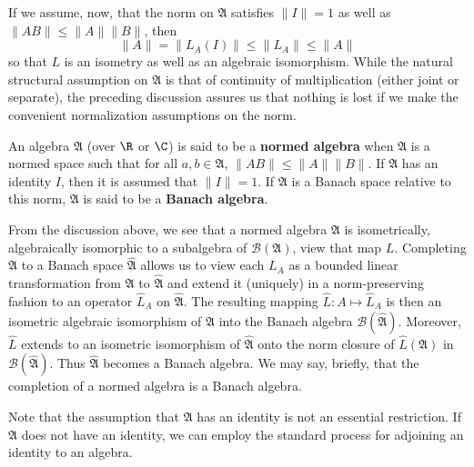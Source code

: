 If we assume, now, that the norm on $\mathfrak{A}$ satisfies $\|I\|=1$ as well as $\|AB\|\leq\|A\|\|B\|$, then
\[\|A\|=\|L_A(I)\|\leq\|L_A\|\leq\|A\|\]
so that $L$ is an isometry as well as an algebraic isomorphism. While the natural structural assumption on $\mathfrak{A}$ is that of continuity of multiplication (either joint or separate), the preceding discussion assures us that nothing is lost if we make the convenient normalization assumptions on the norm.
\begin{definition}
An algebra $\mathfrak{A}$ (over $\R$ or $\C$) is said to be a \textbf{normed algebra} when $\mathfrak{A}$ is a normed space such that for all $a,b\in\mathfrak{A}$, $\|AB\|\leq\|A\|\|B\|$. If $\mathfrak{A}$ has an identity $I$, then it is assumed that $\|I\|=1$. If $\mathfrak{A}$ is a Banach space relative to this norm, $\mathfrak{A}$ is said to be a \textbf{Banach algebra}.
\end{definition}
From the discussion above, we see that a normed algebra $\mathfrak{A}$ is isometrically, algebraically isomorphic to a subalgebra of $\mathcal{B}(\mathfrak{A})$, view that map $L$. Completing $\mathfrak{A}$ to a Banach space $\widehat{\mathfrak{A}}$ allows us to view each $L_A$ as a bounded linear transformation from $\mathfrak{A}$ to $\widehat{\mathfrak{A}}$ and extend it (uniquely) in a norm-preserving fashion to an operator $\hat{L}_A$ on $\widehat{\mathfrak{A}}$. The resulting mapping $\hat{L}:A\mapsto\hat{L}_A$ is then an isometric algebraic isomorphism of $\mathfrak{A}$ into the Banach algebra $\mathcal{B}(\widehat{\mathfrak{A}})$. Moreover, $\hat{L}$ extends to an isometric isomorphism of $\widehat{\mathfrak{A}}$ onto the norm closure of $\hat{L}(\mathfrak{A})$ in $\mathcal{B}(\widehat{\mathfrak{A}})$. Thus $\widehat{\mathfrak{A}}$ becomes a Banach algebra. We may say, briefly, that the completion of a normed algebra is a Banach algebra.\par
Note that the assumption that $\mathfrak{A}$ has an identity is not an essential restriction. If $\mathfrak{A}$ does not have an identity, we can employ the standard process for adjoining an identity to an algebra.
